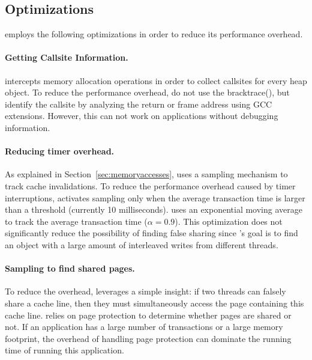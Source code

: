 \subsection{Optimizations}

\SheriffDetect{} employs the following optimizations in order to reduce its performance overhead. 

\paragraph{Getting Callsite Information.}
\SheriffDetect{} intercepts memory allocation operations in order to collect callsites for every heap object. To reduce the performance overhead, \SheriffDetect{} do not use the bracktrace(), but identify the callsite by analyzing the return or frame address using GCC extensions. However, this can not work on applications without debugging information. 

\paragraph{Reducing timer overhead.}
As explained in Section~\ref{sec:memoryaccesses}, \SheriffDetect{} uses a sampling mechanism to track cache invalidations. To reduce the performance overhead caused by timer interruptions, \SheriffDetect{} activates sampling only when the average transaction time is larger than a threshold (currently 10 milliseconds). \SheriffDetect{} uses an exponential moving average to track the average transaction time ($\alpha = 0.9$). This optimization does not significantly reduce the possibility of finding false sharing since \SheriffDetect{}'s goal is to find an object with a large amount of interleaved writes from different threads.

\paragraph{Sampling to find shared pages.} 
To reduce the overhead, \SheriffDetect{} leverages a
simple insight: if two threads can falsely share a cache line, then they must simultaneously access the page containing this cache line. \SheriffDetect{} relies on page protection to determine whether pages are shared or not. If an application has a large number of transactions or a large memory footprint, the overhead of handling page protection can dominate the running time of running this application.

